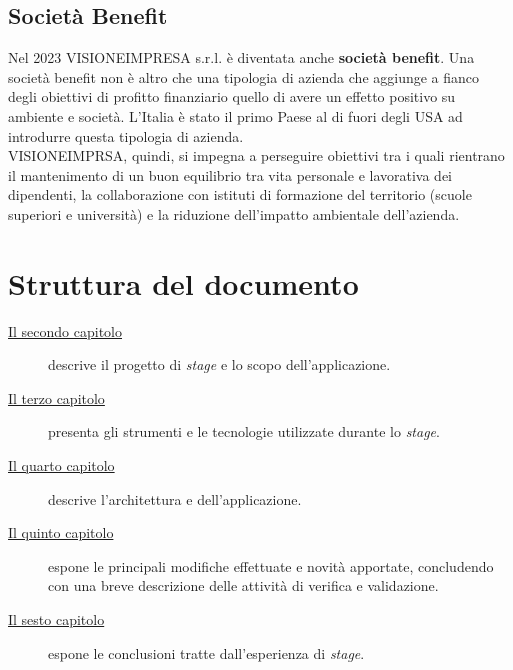 \subsection{Società Benefit}

Nel 2023 VISIONEIMPRESA s.r.l. è diventata anche \textbf{società benefit}. Una società benefit non è altro che una tipologia di azienda che aggiunge a fianco degli obiettivi di profitto finanziario quello di avere un effetto positivo su ambiente e società. L'Italia è stato il primo Paese al di fuori degli USA ad introdurre questa tipologia di azienda.\\
VISIONEIMPRSA, quindi, si impegna a perseguire obiettivi tra i quali rientrano il mantenimento di un buon equilibrio tra vita personale e lavorativa dei dipendenti, la collaborazione con istituti di formazione del territorio (scuole superiori e università) e la riduzione dell'impatto ambientale dell'azienda.

\section{Struttura del documento}

\begin{description} 
    \item[{\hyperref[cap:descrizione-stage]{Il secondo capitolo}}] descrive il progetto di \textit{stage} e lo scopo dell'applicazione.
    
    \item[{\hyperref[cap:tecnologie-strumenti]{Il terzo capitolo}}] presenta gli strumenti e le tecnologie utilizzate durante lo \textit{stage}.
    
    \item[{\hyperref[cap:design]{Il quarto capitolo}}] descrive l'architettura e dell'applicazione.
    
    \item[{\hyperref[cap:codifica]{Il quinto capitolo}}] espone le principali modifiche effettuate e novità apportate, concludendo con una breve descrizione delle attività di verifica e validazione.
    
    \item[{\hyperref[cap:conclusioni]{Il sesto capitolo}}] espone le conclusioni tratte dall'esperienza di \textit{stage}.
\end{description}
